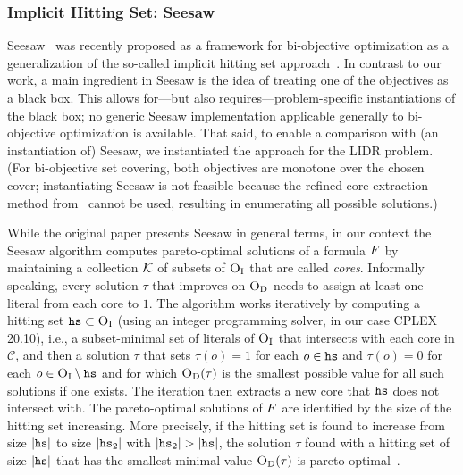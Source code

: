 \subsubsection{Implicit Hitting Set: Seesaw\label{sec:seesaw}}

Seesaw~\autocite{DBLP:conf/cp/JanotaMSM21} was recently proposed as a framework for bi-objective optimization as a
generalization of the so-called implicit hitting set approach~\autocite{DBLP:conf/cp/DaviesB13,DBLP:conf/cp/IgnatievPLM15,DBLP:conf/kr/SaikkoWJ16,DBLP:conf/cade/FazekasBB18,DBLP:conf/kr/SaikkoDAJ18}. In contrast to our work, a main ingredient in Seesaw
is the idea of treating one of the objectives as a black box. This allows for---but also requires---problem-specific instantiations
of the black box; no generic Seesaw implementation applicable generally to bi-objective optimization is available.
That said, to enable a comparison with (an instantiation of) Seesaw, we instantiated the approach for the LIDR problem.
(For bi-objective set covering, both objectives are monotone over the chosen cover; instantiating Seesaw is not feasible because the
refined core extraction method from~\textcite{DBLP:conf/cp/JanotaMSM21} cannot be used, resulting in enumerating all possible solutions.)

While the original paper presents Seesaw in general terms, in our context the Seesaw algorithm computes pareto-optimal solutions of a
formula $F$ by maintaining a collection $\mathcal{K}$ of subsets of $\textsc{O}_{\text{I}}$ that are called \emph{cores}.
Informally speaking, every solution $\tau$ that improves on $\textsc{O}_{\text{D}}$ needs to assign at least one literal from each core to $1$.
The algorithm works iteratively by computing a hitting set $\texttt{hs} \subset \textsc{O}_{\text{I}}$ (using an integer programming solver,
in our case CPLEX 20.10), i.e., a subset-minimal set of literals of $\textsc{O}_{\text{I}}$ that intersects with each core in $\mathcal{C}$, and then
a solution $\tau$ that sets $\tau(o) = 1$ for each $o \in \texttt{hs}$ and $\tau(o) = 0$ for each $o \in \textsc{O}_{\text{I}} \setminus \texttt{hs}$ and for which
$\textsc{O}_{\text{D}}(\tau)$ is the smallest possible value for all such solutions if one exists. The iteration then extracts a new core that $\texttt{hs}$ does not intersect with.
The pareto-optimal solutions of $F$ are identified by the size of the hitting set increasing.
More precisely, if the hitting set is found to increase from size $|\texttt{hs}|$ to size $|\texttt{hs}_2|$ with $|\hs_2|>|\hs|$, the solution $\tau$ found with a hitting set of size $|\texttt{hs}|$ that has the smallest minimal value $\textsc{O}_{\text{D}}(\tau)$ is pareto-optimal~\autocite{DBLP:conf/cp/JanotaMSM21}.

